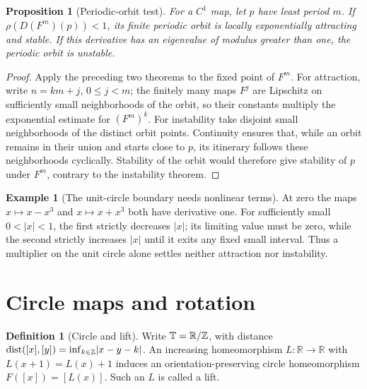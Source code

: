 \documentclass[11pt,oneside]{book}
\newtheorem{proposition}[theorem]{Proposition}
\theoremstyle{definition}
\newtheorem{definition}[theorem]{Definition}
\newtheorem{example}[theorem]{Example}
\theoremstyle{remark}\newtheorem{remark}[theorem]{Remark}
\newcommand{\R}{\mathbb R}\newcommand{\C}{\mathbb C}
\newcommand{\abs}[1]{\lvert#1\rvert}\newcommand{\norm}[1]{\lVert#1\rVert}
\begin{document}
\begin{proposition}[Periodic-orbit test]\label{d13:15:periodic-multipliers}
For a \(C^1\) map, let \(p\) have least period \(m\). If
\(\rho(D(F^m)(p))<1\), its finite periodic orbit is locally exponentially
attracting and stable. If this derivative has an eigenvalue of modulus
greater than one, the periodic orbit is unstable.
\end{proposition}
\begin{proof}
Apply the preceding two theorems to the fixed point of \(F^m\).
For attraction, write \(n=km+j\), \(0\leq j<m\); the finitely many maps
\(F^j\) are Lipschitz on sufficiently small neighborhoods of the orbit,
so their constants multiply the exponential estimate for \((F^m)^k\).
For instability take disjoint small neighborhoods of the distinct orbit
points. Continuity ensures that, while an orbit remains in their union
and starts close to \(p\), its itinerary follows these neighborhoods
cyclically. Stability of the orbit would therefore give stability of
\(p\) under \(F^m\), contrary to the instability theorem.
\end{proof}

\begin{example}[The unit-circle boundary needs nonlinear terms]
At zero the maps \(x\mapsto x-x^3\) and \(x\mapsto x+x^3\) both have
derivative one. For sufficiently small \(0<\abs{x}<1\), the first
strictly decreases \(\abs{x}\); its limiting value must be zero, while
the second strictly increases \(\abs{x}\) until it exits any fixed
small interval. Thus a multiplier on the unit circle alone settles
neither attraction nor instability.
\end{example}

\section{Circle maps and rotation}

\begin{definition}[Circle and lift]\label{d13:15:circle-lift}
Write \(\mathbb T=\R/\Z\), with distance
\(\dist([x],[y])=\inf_{k\in\Z}\abs{x-y-k}\).
An increasing homeomorphism \(L:\R\to\R\) with \(L(x+1)=L(x)+1\)
induces an orientation-preserving circle homeomorphism
\(F([x])=[L(x)]\). Such an \(L\) is called a lift.
\end{definition}
\end{document}
